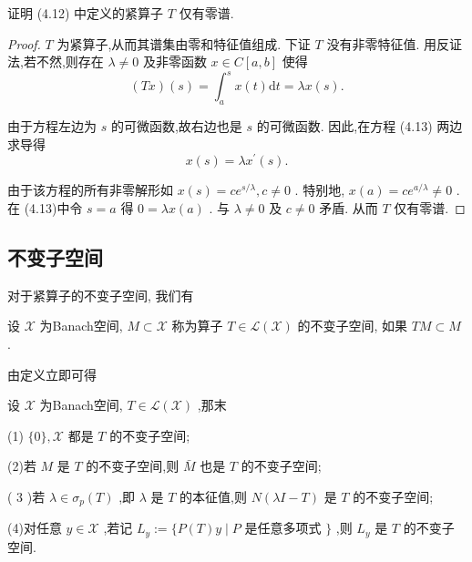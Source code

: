\documentclass[lang=cn,newtx,10pt,scheme=chinese,thmcnt=chapter]{elegantbook}
\newcommand{\dif}{\mathrm{d}}
\begin{document}
\begin{example}
    证明 (4.12) 中定义的紧算子 \(T\) 仅有零谱.
\end{example}
\begin{proof}
 \(T\) 为紧算子,从而其谱集由零和特征值组成. 下证 \(T\) 没有非零特征值. 用反证法,若不然,则存在 \(\lambda  \neq  0\) 及非零函数 \(x \in  C\left\lbrack  {a,b}\right\rbrack\) 使得
\begin{equation}
\left( {Tx}\right) \left( s\right)  = {\int }_{a}^{s}x\left( t\right) {\dif t} = {\lambda x}\left( s\right) . \label{4.13}
\end{equation}

由于方程左边为 \(s\) 的可微函数,故右边也是 \(s\) 的可微函数. 因此,在方程 (4.13) 两边求导得
\begin{equation*}
x\left( s\right)  = \lambda {x}^{\prime }\left( s\right) .
\end{equation*}

由于该方程的所有非零解形如 \(x\left( s\right)  = c{e}^{s/\lambda },c \neq  0\) . 特别地, \(x\left( a\right)  = c{e}^{a/\lambda } \neq  0\) . 在 (4.13)中令 \(s = a\) 得 \(0 = {\lambda x}\left( a\right)\) . 与 \(\lambda  \neq  0\) 及 \(c \neq  0\) 矛盾. 从而 \(T\) 仅有零谱.
\end{proof}


\subsection{不变子空间}

对于紧算子的不变子空间, 我们有
\begin{definition}
    设 \(\mathcal{X}\) 为Banach空间, \(M \subset  \mathcal{X}\) 称为算子 \(T \in  \mathcal{L}\left( \mathcal{X}\right)\) 的不变子空间, 如果 \({TM} \subset  M\) .

\end{definition}

由定义立即可得
\begin{proposition}
    设 \(\mathcal{X}\) 为Banach空间, \(T \in  \mathcal{L}\left( \mathcal{X}\right)\) ,那末

(1) \(\{ 0\} ,\mathcal{X}\) 都是 \(T\) 的不变子空间;

(2)若 \(M\) 是 \(T\) 的不变子空间,则 \(\bar{M}\) 也是 \(T\) 的不变子空间;

( 3 )若 \(\lambda  \in  {\sigma }_{p}\left( T\right)\) ,即 \(\lambda\) 是 \(T\) 的本征值,则 \(N\left( {{\lambda I} - T}\right)\) 是 \(T\) 的不变子空间;

(4)对任意 \(y \in  \mathcal{X}\) ,若记 \({L}_{y} \mathrel{\text{ := }} \{ P\left( T\right) y \mid  P\) 是任意多项式 \(\}\) ,则 \({L}_{y}\) 是 \(T\) 的不变子空间.

\end{proposition}
\end{document}

